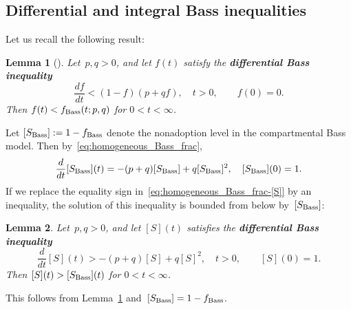 \documentclass[review]{elsarticle}
\newtheorem{lemma}{Lemma}
\begin{document}
\subsection{Differential and integral Bass inequalities}
Let us recall the following result:
\begin{lemma}[\cite{OR-10}]
	\label{lem:Bass-inequality}
	Let~$p,q>0$, and let $f(t)$ satisfy the {\bf differential Bass inequality}
	$$
	\frac{df}{dt} < (1-f)(p+qf), \quad t>0, \qquad f(0)=0. 
	$$
	Then $f(t) < f_{\rm Bass}(t;p,q)$ for $0<t<\infty$.
\end{lemma}

Let $[S_{\rm Bass}]:=1-f_{\rm Bass}$ denote the nonadoption level in the compartmental
Bass model. Then by~\eqref{eq:homogeneous_Bass_frac},
\begin{equation}
	\label{eq:homogeneous_Bass_frac-[S]}
	\frac{d}{dt}[S_{\rm Bass}](t)%
	 =-(p+q)[S_{\rm Bass}]+ q[S_{\rm Bass}]^2  , \quad [S_{\rm Bass}](0)=1.
\end{equation}
If we replace the equality sign in~\eqref{eq:homogeneous_Bass_frac-[S]} by an inequality, the solution of this inequality is bounded from below by~$[S_{\rm Bass}]$:
 \begin{lemma}
 \label{cor:diffBass}
Let~$p,q>0$, and let $[S](t)$ satisfies the {\bf differential Bass inequality}
\begin{equation*}
	\label{eq:homogeneous_Bass_frac-[S]-inequality}
	\frac{d}{dt}[S](t)%
	>-(p+q)[S]+ q[S]^2, \quad t>0, \qquad [S](0)=1.
\end{equation*}
 Then $[S](t)> [S_{\rm Bass}](t)$ for $0<t<\infty$.
 \end{lemma}
\begin{pf}
This follows from Lemma~\ref{lem:Bass-inequality}  and~$[S_{\rm Bass}]=1-f_{\rm Bass}$.
\end{pf}
\end{document}
